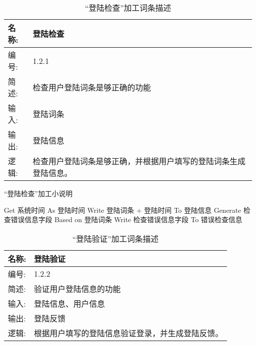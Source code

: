 \begin{table}[H]  
\caption{“登陆检查”加工词条描述}  
\begin{center}  
    \begin{tabular}{l p{11cm}} 
        \hline
        \quad 名称:  &   登陆检查 \\
        \hline
        \quad 编号:  & 1.2.1 \\
        \hline
        \quad 简述:  & 检查用户登陆词条是够正确的功能 \\
        \hline
        \quad 输入:  & 登陆词条\\
        \hline
        \quad 输出:  & 登陆信息\\
        \hline
        \quad 逻辑:  & 检查用户登陆词条是够正确，并根据用户填写的登陆词条生成登陆信息。 \\
        \hline
    \end{tabular}
    \label{tab1}
\end{center}
\end{table}

\begin{algorithm}[H]
    \renewcommand{\thealgorithm}{}
    \caption{“登陆检查”加工小说明} 
    \label{alg3} 
    \begin{algorithmic}[1]
        \STATE Get 系统时间 As 登陆时间
        \STATE Write 登陆词条 + 登陆时间 To 登陆信息
        \ELSE
        \STATE Generate 检查错误信息字段 Based on 登陆词条
        \STATE Write 检查错误信息字段 To 错误检查信息 
        \ENDIF 
    \end{algorithmic} 
\end{algorithm}

\begin{table}[H]  
\caption{“登陆验证”加工词条描述}  
\begin{center}  
    \begin{tabular}{l p{11cm}} 
        \hline
        \quad 名称:  &   登陆验证 \\
        \hline
        \quad 编号:  & 1.2.2 \\
        \hline
        \quad 简述:  & 验证用户登陆信息的功能 \\
        \hline
        \quad 输入:  & 登陆信息、用户信息\\
        \hline
        \quad 输出:  & 登陆反馈\\
        \hline
        \quad 逻辑:  & 根据用户填写的登陆信息验证登录，并生成登陆反馈。 \\
        \hline
    \end{tabular}
    \label{tab1}
\end{center}
\end{table}

